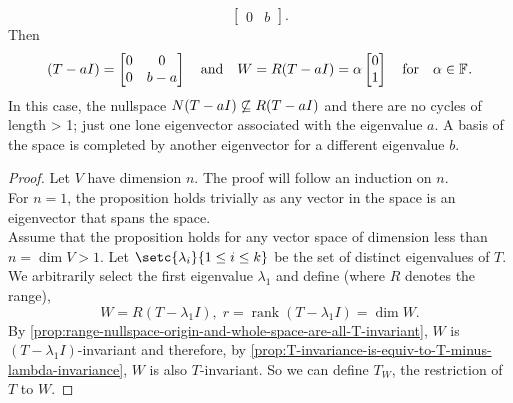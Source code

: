 \documentclass[../MathsNotesBase.tex]{subfiles}
\begin{document}
{{\[\begin{bmatrix}
				0 & b
			\end{bmatrix}.
			\]
			Then 
			\[ 
			(T - a I) = \begin{bmatrix}
				0 & 0\\
				0 & b - a
			\end{bmatrix}   \hspace{10pt}\text{and}\hspace{10pt}
			W = R(T - a I) = \alpha \begin{bmatrix}0\\1\end{bmatrix} \hspace{10pt}\text{for}\hspace{10pt} \alpha \in \mathbb{F}^{}.
			\] 
			In this case, the nullspace ${ N(T - a I) \centernot\subseteq R(T - a I) }$ and there are no cycles of length > 1; just one lone eigenvector associated with the eigenvalue $a$. A basis of the space is completed by another eigenvector for a different eigenvalue $b$.
		}
		
		\bigskip
		\begin{proof}
			Let $V$ have dimension $n$. The proof will follow an induction on $n$.\\
			
			For ${ n = 1 }$, the proposition holds trivially as any vector in the space is an eigenvector that spans the space.\\
			
			Assume that the proposition holds for any vector space of dimension less than ${ n = \dim V > 1 }$. Let ${ \setc{\lambda_i}{1 \leq i \leq k} }$ be the set of distinct eigenvalues of $T$. We arbitrarily select the first eigenvalue $\lambda_1$ and define (where $R$ denotes the range),
			\[ W = R(T - \lambda_1 I), \; r = \operatorname{rank} (T - \lambda_1 I) = \dim W. \]
			By \autoref{prop:range-nullspace-origin-and-whole-space-are-all-T-invariant}, $W$ is $(T - \lambda_1 I)$-invariant and therefore, by \autoref{prop:T-invariance-is-equiv-to-T-minus-lambda-invariance}, $W$ is also $T$-invariant. So we can define $T_W$, the restriction of $T$ to $W$.
			
			

\end{proof}}
\end{document}
